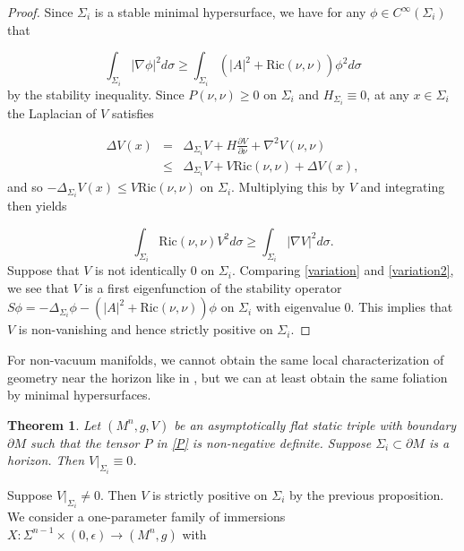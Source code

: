 \documentclass[12pt]{amsart}
\newtheorem{theorem}{Theorem}[section]
\theoremstyle{definition}
\numberwithin{equation}{section}
\begin{document}
\begin{proof}
Since $\Sigma_{i}$ is a stable minimal hypersurface, we have for any $\phi \in C^{\infty}(\Sigma_{i})$ that

\begin{equation} \label{variation}
    \int_{\Sigma_{i}} |\nabla \phi|^{2} d\sigma \geq \int_{\Sigma_{i}} \left( |A|^{2} + \text{Ric}(\nu,\nu) \right) \phi^{2} d\sigma
\end{equation}
by the stability inequality. Since $P(\nu,\nu) \geq 0$ on $\Sigma_{i}$ and $H_{\Sigma_{i}} \equiv 0$, at any $x \in \Sigma_{i}$ the Laplacian of $V$ satisfies

\begin{eqnarray*}
    \Delta V(x) &=& \Delta_{\Sigma_{i}} V + H \frac{\partial V}{\partial \nu} + \nabla^{2} V(\nu,\nu) \\
                       &\leq& \Delta_{\Sigma_{i}} V + V \text{Ric}(\nu,\nu) + \Delta V(x),
\end{eqnarray*}
and so $-\Delta_{\Sigma_{i}} V(x) \leq V \text{Ric}(\nu,\nu)$ on $\Sigma_{i}$. Multiplying this by $V$ and integrating then yields 

\begin{equation} \label{variation2}
   \int_{\Sigma_{i}} \text{Ric}(\nu,\nu) V^{2} d\sigma \geq  \int_{\Sigma_{i}} |\nabla V|^{2} d\sigma.
\end{equation}
Suppose that $V$ is not identically $0$ on $\Sigma_{i}$. Comparing \eqref{variation} and \eqref{variation2}, we see that $V$ is a first eigenfunction of the stability operator $S \phi = -\Delta_{\Sigma_{i}} \phi - \left(|A|^{2} + \text{Ric}(\nu,\nu) \right) \phi$ on $\Sigma_{i}$ with eigenvalue $0$. This implies that $V$ is non-vanishing and hence strictly positive on $\Sigma_{i}$.
\end{proof}
For non-vacuum manifolds, we cannot obtain the same local characterization of geometry near the horizon like in \cite{HMM17}, but we can at least obtain the same foliation by minimal hypersurfaces.
\begin{theorem}
Let $(M^{n},g,V)$ be an asymptotically flat static triple with boundary $\partial M$ such that the tensor $P$ in \eqref{P} is non-negative definite. Suppose $\Sigma_{i} \subset \partial M$ is a horizon. Then $V|_{\Sigma_{i}} \equiv 0$. 
\end{theorem}
Suppose $V|_{\Sigma_{i}}\neq 0$. Then $V$ is strictly positive on $\Sigma_{i}$ by the previous proposition. We consider a one-parameter family of immersions $X: \Sigma^{n-1} \times (0, \epsilon) \rightarrow (M^{n},g)$ with
\end{document}
